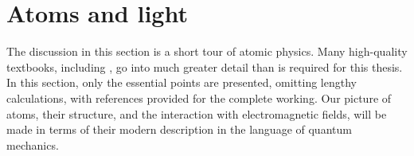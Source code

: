 	

\section{Atoms and light}

	The discussion in this section is a short tour of atomic physics.
	Many high-quality textbooks, including \cite{FootAtomic,BinneyBook}, go into much greater detail than is required for this thesis.
	In this section, only the essential points are presented, omitting lengthy calculations, with references provided for the complete working.
	Our picture of atoms, their structure, and the interaction with electromagnetic fields, will be made in terms of their modern description in the language of quantum mechanics.

